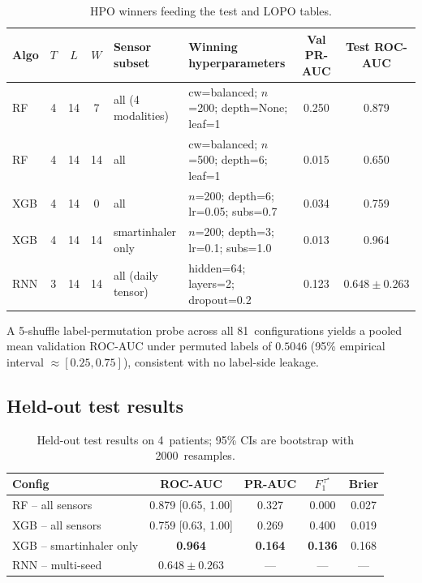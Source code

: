 \documentclass[11pt,a4paper]{article}
\newcommand{\rocauc}{ROC\nobreakdash-AUC}
\newcommand{\prauc}{PR\nobreakdash-AUC}
\begin{document}
\begin{table}[t]
\centering
\caption{HPO winners feeding the test and LOPO tables.}
\label{tab:hpo-winners}
\small
\begin{tabular}{lcccll cc}
\toprule
\textbf{Algo} & $T$ & $L$ & $W$ & \textbf{Sensor subset} &
\textbf{Winning hyperparameters} & \textbf{Val \prauc{}} &
\textbf{Test \rocauc{}} \\
\midrule
RF  & 4 & 14 & 7  & all (4 modalities)  & cw=balanced; $n$=200; depth=None; leaf=1 & 0.250 & 0.879 \\
RF  & 4 & 14 & 14 & all                 & cw=balanced; $n$=500; depth=6; leaf=1    & 0.015 & 0.650 \\
XGB & 4 & 14 & 0  & all                 & $n$=200; depth=6; lr=0.05; subs=0.7      & 0.034 & 0.759 \\
XGB & 4 & 14 & 14 & smartinhaler only   & $n$=200; depth=3; lr=0.1; subs=1.0       & 0.013 & 0.964 \\
RNN & 3 & 14 & 14 & all (daily tensor)  & hidden=64; layers=2; dropout=0.2         & 0.123 & $0.648 \pm 0.263$ \\
\bottomrule
\end{tabular}
\end{table}

A 5-shuffle label-permutation probe across all 81~configurations
yields a pooled mean validation \rocauc{} under permuted labels of
$0.5046$ (95\% empirical interval $\approx[0.25,0.75]$), consistent
with no label-side leakage.

\subsection{Held-out test results}\label{sec:results-test}

\begin{table}[H]
\centering
\caption{Held-out test results on 4~patients; 95\% CIs are bootstrap
with 2000~resamples.}
\label{tab:onset-headline}
\small
\begin{tabular}{lcccc}
\toprule
\textbf{Config} & \textbf{\rocauc{}} & \textbf{\prauc{}} &
$F_1^{\,\tau^{\star}}$ & \textbf{Brier} \\
\midrule
RF -- all sensors        & 0.879 [0.65, 1.00] & 0.327 & 0.000 & 0.027 \\
XGB -- all sensors       & 0.759 [0.63, 1.00] & 0.269 & 0.400 & 0.019 \\
XGB -- smartinhaler only & \textbf{0.964}     & \textbf{0.164} & \textbf{0.136} & 0.168 \\
RNN -- multi-seed        & $0.648\pm 0.263$   & ---   & ---   & --- \\
\bottomrule
\end{tabular}
\end{table}
\end{document}
